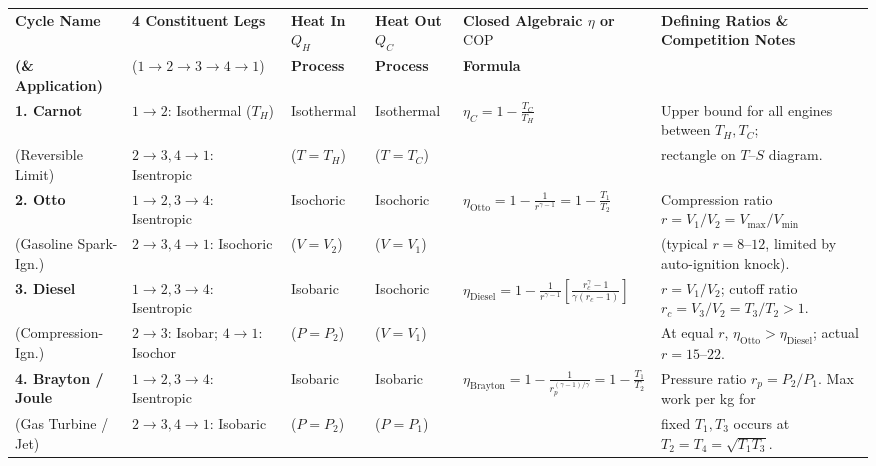 \begin{table}[!htbp]
\centering
{}\label{tab:09:master-cycles}
\scriptsize\setlength{\tabcolsep}{2.5pt}\renewcommand{\arraystretch}{1.20}
\begin{tabularx}{\linewidth}{@{}l l l l l X@{}}
\toprule
\textbf{Cycle Name} & \textbf{4 Constituent Legs} & \textbf{Heat In $Q_H$} & \textbf{Heat Out $Q_C$} & \textbf{Closed Algebraic $\eta$ or $\mathrm{COP}$} & \textbf{Defining Ratios \& Competition Notes} \\
\textbf{(\& Application)} & ($1\to 2\to 3\to 4\to 1$) & \textbf{Process} & \textbf{Process} & \textbf{Formula} & \\
\midrule
\textbf{1. Carnot} & $1\to 2$: Isothermal ($T_H$) & Isothermal & Isothermal & $\displaystyle \eta_C = 1 - \frac{T_C}{T_H}$ & Upper bound for all engines between $T_H, T_C$; \\
(Reversible Limit) & $2\to 3, 4\to 1$: Isentropic & ($T = T_H$) & ($T = T_C$) & & rectangle on $T$--$S$ diagram. \\[3pt]
\textbf{2. Otto} & $1\to 2, 3\to 4$: Isentropic & Isochoric & Isochoric & $\displaystyle \eta_{\mathrm{Otto}} = 1 - \frac{1}{r^{\gamma - 1}} = 1 - \frac{T_1}{T_2}$ & Compression ratio $r = V_1/V_2 = V_{\max}/V_{\min}$ \\
(Gasoline Spark-Ign.) & $2\to 3, 4\to 1$: Isochoric & ($V = V_2$) & ($V = V_1$) & & (typical $r = 8\text{--}12$, limited by auto-ignition knock). \\[3pt]
\textbf{3. Diesel} & $1\to 2, 3\to 4$: Isentropic & Isobaric & Isochoric & $\displaystyle \eta_{\mathrm{Diesel}} = 1 - \frac{1}{r^{\gamma - 1}}\left[\frac{r_c^\gamma - 1}{\gamma(r_c - 1)}\right]$ & $r = V_1/V_2$; cutoff ratio $r_c = V_3/V_2 = T_3/T_2 > 1$. \\
(Compression-Ign.) & $2\to 3$: Isobar; $4\to 1$: Isochor & ($P = P_2$) & ($V = V_1$) & & At equal $r$, $\eta_{\mathrm{Otto}} > \eta_{\mathrm{Diesel}}$; actual $r = 15\text{--}22$. \\[3pt]
\textbf{4. Brayton / Joule} & $1\to 2, 3\to 4$: Isentropic & Isobaric & Isobaric & $\displaystyle \eta_{\mathrm{Brayton}} = 1 - \frac{1}{r_p^{(\gamma - 1)/\gamma}} = 1 - \frac{T_1}{T_2}$ & Pressure ratio $r_p = P_2/P_1$. Max work per kg for \\
(Gas Turbine / Jet) & $2\to 3, 4\to 1$: Isobaric & ($P = P_2$) & ($P = P_1$) & & fixed $T_1, T_3$ occurs at $T_2 = T_4 = \sqrt{T_1 T_3}$. \\[3pt]

\end{tabularx}
\end{table}
